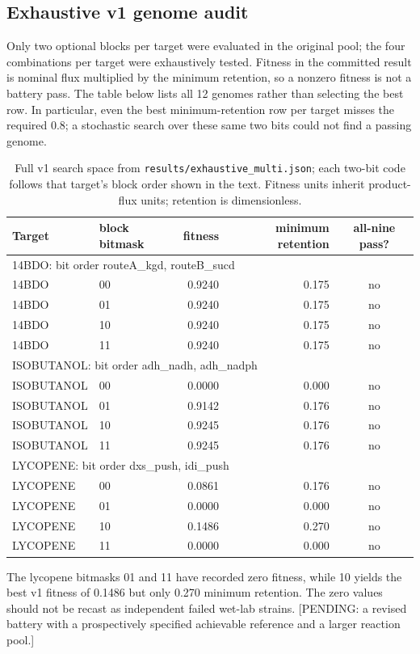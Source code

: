 \subsection{Exhaustive v1 genome audit}
Only two optional blocks per target were evaluated in the original pool; the four combinations per target were exhaustively tested. Fitness in the committed result is nominal flux multiplied by the minimum retention, so a nonzero fitness is not a battery pass. The table below lists all 12 genomes rather than selecting the best row. In particular, even the best minimum-retention row per target misses the required 0.8; a stochastic search over these same two bits could not find a passing genome.\begin{table}[!htbp]\centering\small\caption{Full v1 search space from \texttt{results/exhaustive\_multi.json}; each two-bit code follows that target's block order shown in the text. Fitness units inherit product-flux units; retention is dimensionless.}\begin{tabular}{llrrc}\hline Target & block bitmask & fitness & minimum retention & all-nine pass? \\\hline
\multicolumn{5}{l}{14BDO: bit order routeA\_kgd, routeB\_sucd}\\
14BDO & 00 & 0.9240 & 0.175 & no\\
14BDO & 01 & 0.9240 & 0.175 & no\\
14BDO & 10 & 0.9240 & 0.175 & no\\
14BDO & 11 & 0.9240 & 0.175 & no\\
\multicolumn{5}{l}{ISOBUTANOL: bit order adh\_nadh, adh\_nadph}\\
ISOBUTANOL & 00 & 0.0000 & 0.000 & no\\
ISOBUTANOL & 01 & 0.9142 & 0.176 & no\\
ISOBUTANOL & 10 & 0.9245 & 0.176 & no\\
ISOBUTANOL & 11 & 0.9245 & 0.176 & no\\
\multicolumn{5}{l}{LYCOPENE: bit order dxs\_push, idi\_push}\\
LYCOPENE & 00 & 0.0861 & 0.176 & no\\
LYCOPENE & 01 & 0.0000 & 0.000 & no\\
LYCOPENE & 10 & 0.1486 & 0.270 & no\\
LYCOPENE & 11 & 0.0000 & 0.000 & no\\
\hline\end{tabular}\end{table}
The lycopene bitmasks 01 and 11 have recorded zero fitness, while 10 yields the best v1 fitness of 0.1486 but only 0.270 minimum retention. The zero values should not be recast as independent failed wet-lab strains. [PENDING: a revised battery with a prospectively specified achievable reference and a larger reaction pool.]

